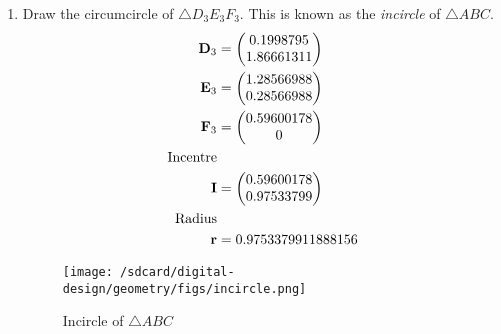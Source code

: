 \documentclass[11pt]{book}
\begin{document}
\begin{enumerate}[label=\thesection.\arabic*.,ref=\thesection.\theenumi]
\item Draw the circumcircle of $\triangle D_3E_3F_3$.  This is known as the {\em incircle} of $\triangle ABC$. \\
\solution 
\begin{align}
    \mathbf{D}_3 &= \begin{pmatrix}0.1998795  \\ 1.86661311\end{pmatrix} \\
    \mathbf{E}_3 &= \begin{pmatrix}1.28566988  \\ 0.28566988\end{pmatrix} \\
    \mathbf{F}_3 &= \begin{pmatrix}0.59600178  \\ 0\end{pmatrix}\\
\text{Incentre}\\ 
    \mathbf{I} &= \begin{pmatrix}0.59600178 \\ 0.97533799\end{pmatrix} \\
\text{Radius}\\
 \mathbf{r} &=  0.9753379911888156
\end{align}
\begin{figure}[H]
\texttt{[image: /sdcard/digital-design/geometry/figs/incircle.png]}
\caption{Incircle of $\triangle ABC$}
\label{fig:fig3}
\end{figure}
  

\end{enumerate}
\end{document}
